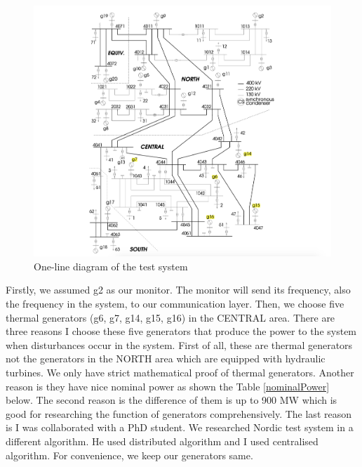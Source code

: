 \documentclass{report}
\begin{document}
\begin{figure}[htbp]
\centering
\includegraphics[width = \textwidth]{figure/4_1_1_nordic.png}
\caption{One-line diagram of the test system}
\label{4_1_1_nordic}
\end{figure}

Firstly, we assumed g2 as our monitor. The monitor will send its frequency, also the frequency in the system, to our communication layer. Then, we choose five thermal generators  (g6, g7, g14, g15, g16) in the CENTRAL area. There are three reasons I choose these five generators that produce the power to the system when disturbances occur in the system. First of all, these are thermal generators not the generators in the NORTH area which are equipped with hydraulic turbines. We only have strict mathematical proof of thermal generators. Another reason is they have nice nominal power as shown the Table \textcolor{red}{\ref{nominalPower}} below. The second reason is the difference of them is up to 900 MW which is good for researching the function of generators comprehensively. The last reason is I was collaborated with a PhD student. We researched Nordic test system in a different algorithm. He used distributed algorithm and I used centralised algorithm. For convenience, we keep our generators same.\\
\end{document}
